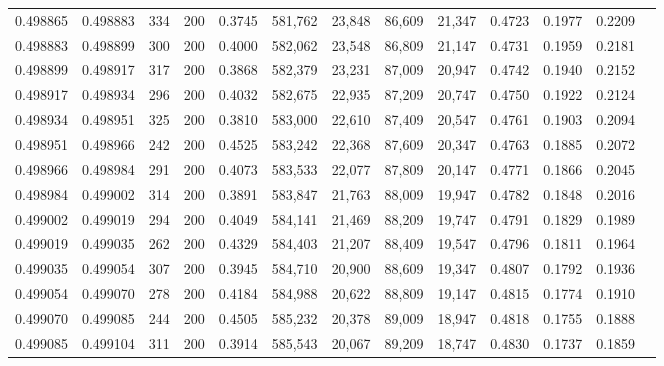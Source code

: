 \begin{tabular}{rrrrrrrrrrrrr}
0.498865 & 0.498883 &    334 & 200 &                                     0.3745 & 581,762 &  23,848 &  86,609 &  21,347 & 0.4723 & 0.1977 & 0.2209 \\
0.498883 & 0.498899 &    300 & 200 &                                     0.4000 & 582,062 &  23,548 &  86,809 &  21,147 & 0.4731 & 0.1959 & 0.2181 \\
0.498899 & 0.498917 &    317 & 200 &                                     0.3868 & 582,379 &  23,231 &  87,009 &  20,947 & 0.4742 & 0.1940 & 0.2152 \\
0.498917 & 0.498934 &    296 & 200 &                                     0.4032 & 582,675 &  22,935 &  87,209 &  20,747 & 0.4750 & 0.1922 & 0.2124 \\
0.498934 & 0.498951 &    325 & 200 &                                     0.3810 & 583,000 &  22,610 &  87,409 &  20,547 & 0.4761 & 0.1903 & 0.2094 \\
0.498951 & 0.498966 &    242 & 200 &                                     0.4525 & 583,242 &  22,368 &  87,609 &  20,347 & 0.4763 & 0.1885 & 0.2072 \\
0.498966 & 0.498984 &    291 & 200 &                                     0.4073 & 583,533 &  22,077 &  87,809 &  20,147 & 0.4771 & 0.1866 & 0.2045 \\
0.498984 & 0.499002 &    314 & 200 &                                     0.3891 & 583,847 &  21,763 &  88,009 &  19,947 & 0.4782 & 0.1848 & 0.2016 \\
0.499002 & 0.499019 &    294 & 200 &                                     0.4049 & 584,141 &  21,469 &  88,209 &  19,747 & 0.4791 & 0.1829 & 0.1989 \\
0.499019 & 0.499035 &    262 & 200 &                                     0.4329 & 584,403 &  21,207 &  88,409 &  19,547 & 0.4796 & 0.1811 & 0.1964 \\
0.499035 & 0.499054 &    307 & 200 &                                     0.3945 & 584,710 &  20,900 &  88,609 &  19,347 & 0.4807 & 0.1792 & 0.1936 \\
0.499054 & 0.499070 &    278 & 200 &                                     0.4184 & 584,988 &  20,622 &  88,809 &  19,147 & 0.4815 & 0.1774 & 0.1910 \\
0.499070 & 0.499085 &    244 & 200 &                                     0.4505 & 585,232 &  20,378 &  89,009 &  18,947 & 0.4818 & 0.1755 & 0.1888 \\
0.499085 & 0.499104 &    311 & 200 &                                     0.3914 & 585,543 &  20,067 &  89,209 &  18,747 & 0.4830 & 0.1737 & 0.1859 \\

\end{tabular}
